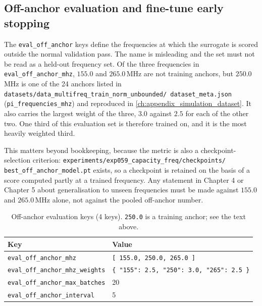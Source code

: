 \clearpage

\subsection{Off-anchor evaluation and fine-tune early stopping}
\label{subsec:appb_eval_keys}

The \texttt{eval\_off\_anchor} keys define the frequencies at which the surrogate is scored
outside the normal validation pass. The name is misleading and the set must not be read as
a held-out frequency set. Of the three frequencies in \texttt{eval\_off\_anchor\_mhz},
$155.0$ and $265.0$\,MHz are not training anchors, but $250.0$\,MHz is one of the 24
anchors listed in \texttt{datasets/data\_multifreq\_train\_norm\_unbounded/\allowbreak
dataset\_meta.json} (\texttt{pi\_frequencies\_mhz}) and reproduced in
\autoref{ch:appendix_simulation_dataset}. It also carries the largest weight of the three,
$3.0$ against $2.5$ for each of the other two. One third of this evaluation set is
therefore trained on, and it is the most heavily weighted third.

This matters beyond bookkeeping, because the metric is also a checkpoint-selection
criterion: \texttt{experiments/exp059\_capacity\_freq/checkpoints/\allowbreak
best\_off\_anchor\_model.pt} exists, so a checkpoint is retained on the basis of a score
computed partly at a trained frequency. Any statement in Chapter 4 or Chapter 5 about
generalisation to unseen frequencies must be made against $155.0$ and $265.0$\,MHz alone,
not against the pooled off-anchor number.

\begin{table}[htbp]
\centering
\caption{Off-anchor evaluation keys (4 keys). \texttt{250.0} is a training anchor; see the
text above.}
\label{tab:appb_offanchor}
\begin{tabular}{@{}lp{}@{}}
\hline
Key & Value \\
\hline
\texttt{eval\_off\_anchor\_mhz} & \texttt{[ 155.0, 250.0, 265.0 ]} \\
\texttt{eval\_off\_anchor\_mhz\_weights} & \texttt{\{ "155": 2.5, "250": 3.0, "265": 2.5 \}} \\
\texttt{eval\_off\_anchor\_max\_batches} & 20 \\
\texttt{eval\_off\_anchor\_interval} & 5 \\
\hline
\end{tabular}
\end{table}

